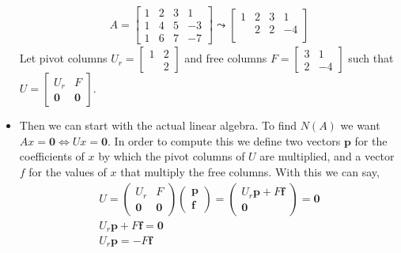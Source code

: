 \documentclass[11pt]{article}
\begin{document}
\begin{itemize}
		\begin{align}
       A = \begin{bmatrix}
         1 & 2 & 3 & 1\\
       1 & 4 & 5 & -3\\
       1 & 6 & 7 & -7
       \end{bmatrix}
	   \leadsto
	   \begin{bmatrix}
		   \boxed{1} & 2 & 3 & 1\\
		 & \boxed{2} & 2 & -4\\
	    &  &  & 
	   \end{bmatrix}
   \end{align} 
   Let pivot columns $U_r =\begin{bmatrix}
     1 & 2\\
    & 2
   \end{bmatrix}$ and free columns $F=\begin{bmatrix}
     3 & 1\\
   2 & -4
   \end{bmatrix}$
   such that
       $U=\begin{bmatrix}
         U_r & F\\
		 \mathbf{0} & \mathbf{0}
       \end{bmatrix}$.
   \item Then we can start with the actual linear algebra. To find $N(A)$ we want $Ax = \mathbf{0} \iff Ux = \mathbf{0}$. In order to compute this we define two vectors $\mathbf{p}$ for the coefficients of $x$ by which the pivot columns of $U$ are multiplied, and a vector $f$ for the values of $x$ that multiply the free columns. With this we can say,
   \begin{gather}
	   U=\begin{pmatrix}
         U_r & F\\
		 \mathbf{0} & \mathbf{0}
       \end{pmatrix}
	   \begin{pmatrix}
		   \mathbf{p}\\
		   \mathbf{f}
	   \end{pmatrix}
		= \begin{pmatrix}
		   U_r \mathbf{p} + F\mathbf{f}\\
		   \mathbf{0}
	   \end{pmatrix}
	   = \mathbf{0}  \\
   U_r \mathbf{p} + F\mathbf{f} = \mathbf{0} \\
   \boxed{U_r \mathbf{p} =- F\mathbf{f}}
   \end{gather}

\end{itemize}
\end{document}

